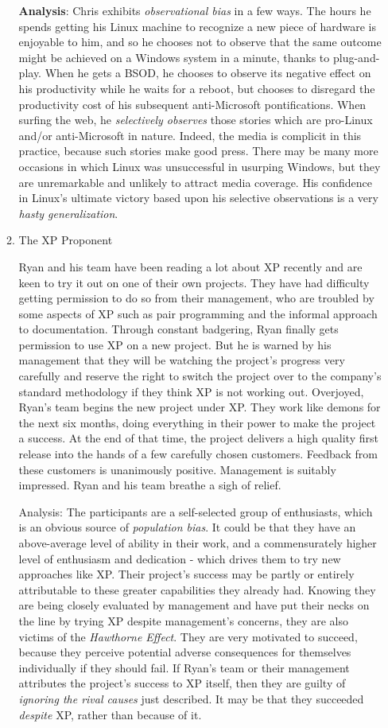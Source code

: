 \documentclass{article}
\begin{document}
\begin{enumerate}
\begin{enumerate}
\textbf{Analysis}: Chris exhibits \emph{observational bias} in a few ways. The hours
he spends getting his Linux machine to recognize a new piece of hardware
is enjoyable to him, and so he chooses not to observe that the same
outcome might be achieved on a Windows system in a minute, thanks to
plug-and-play. When he gets a BSOD, he chooses to observe its negative
effect on his productivity while he waits for a reboot, but chooses to
disregard the productivity cost of his subsequent anti-Microsoft
pontifications. When surfing the web, he \emph{selectively observes} those
stories which are pro-Linux and/or anti-Microsoft in nature. Indeed, the
media is complicit in this practice, because such stories make good
press. There may be many more occasions in which Linux was unsuccessful
in usurping Windows, but they are unremarkable and unlikely to attract
media coverage. His confidence in Linux's ultimate victory based upon
his selective observations is a very \emph{hasty generalization}.

\item The XP Proponent
\label{sec:orgheadline375}

Ryan and his team have been reading a lot about XP recently and are keen
to try it out on one of their own projects. They have had difficulty
getting permission to do so from their management, who are troubled by
some aspects of XP such as pair programming and the informal approach to
documentation. Through constant badgering, Ryan finally gets permission
to use XP on a new project. But he is warned by his management that they
will be watching the project's progress very carefully and reserve the
right to switch the project over to the company's standard methodology
if they think XP is not working out. Overjoyed, Ryan's team begins the
new project under XP. They work like demons for the next six months,
doing everything in their power to make the project a success. At the
end of that time, the project delivers a high quality first release into
the hands of a few carefully chosen customers. Feedback from these
customers is unanimously positive. Management is suitably impressed.
Ryan and his team breathe a sigh of relief.

Analysis: The participants are a self-selected group of enthusiasts,
which is an obvious source of \emph{population bias}. It could be that they
have an above-average level of ability in their work, and a
commensurately higher level of enthusiasm and dedication - which drives
them to try new approaches like XP. Their project's success may be
partly or entirely attributable to these greater capabilities they
already had. Knowing they are being closely evaluated by management and
have put their necks on the line by trying XP despite management's
concerns, they are also victims of the \emph{Hawthorne Effect}. They are very
motivated to succeed, because they perceive potential adverse
consequences for themselves individually if they should fail. If Ryan's
team or their management attributes the project's success to XP itself,
then they are guilty of \emph{ignoring the rival causes} just described. It
may be that they succeeded \emph{despite} XP, rather than because of it.


\end{enumerate}
\end{enumerate}
\end{document}
